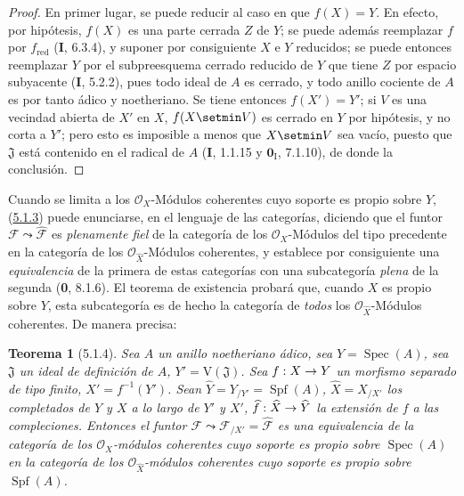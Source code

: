 \documentclass[10pt,oneside,openany]{book}
\theoremstyle{egaenv}\newtheorem*{env}{---}
\theoremstyle{egastatement}
\newtheorem*{theorem}{Teorema}
\theoremstyle{egadescription}
\renewcommand{\to}{\mathchoice{\longrightarrow}{\rightarrow}{\rightarrow}{\rightarrow}}
\begin{document}
\begin{proof}
En primer lugar, se puede reducir al caso en que $f(X)=Y$. En efecto, por hipótesis,
$f(X)$ es una parte cerrada $Z$ de $Y$; se puede además reemplazar $f$ por
$f_{\mathrm{red}}$ (\textbf{I}, 6.3.4), y suponer por consiguiente $X$ e $Y$ reducidos; se puede entonces
reemplazar $Y$ por el subpreesquema cerrado reducido de $Y$ que tiene $Z$ por espacio
subyacente (\textbf{I}, 5.2.2), pues todo ideal de $A$ es cerrado, y todo anillo cociente de
$A$ es por tanto ádico y noetheriano. Se tiene entonces $f(X')=Y'$; si $V$ es una vecindad
abierta de $X'$ en $X$, $f(X\setmin V)$ es cerrado en $Y$ por hipótesis, y no corta
a $Y'$; pero esto es imposible a menos que $X\setmin V$ sea vacío, puesto que
$\mathfrak J$ está contenido en el radical de $A$ (\textbf{I}, 1.1.15 y $\mathbf{0}_{\mathrm I}$,
7.1.10), de donde la conclusión.
\end{proof}

Cuando se limita a los $\mathcal O_X$-Módulos coherentes cuyo soporte es propio
sobre $Y$, (\hyperref[III.5.1.3-fr]{5.1.3}) puede enunciarse, en el lenguaje de las
categorías, diciendo que el funtor
$\mathcal F\leadsto\widehat{\mathcal F}$ es \emph{plenamente fiel} de la categoría de los
$\mathcal O_X$-Módulos del tipo precedente en la categoría de los
$\mathcal O_{\widehat X}$-Módulos coherentes, y establece por consiguiente una \emph{equivalencia} de
la primera de estas categorías con una subcategoría \emph{plena} de la segunda
(\textbf{0}, 8.1.6). El teorema de existencia probará que, cuando $X$ es propio sobre $Y$,
esta subcategoría es de hecho la categoría de \emph{todos} los
$\mathcal O_{\widehat X}$-Módulos coherentes. De manera precisa:

\begin{theorem}[5.1.4]
\label{III.5.1.4}
\label{III.5.1.4-fr}
Sea $A$ un anillo noetheriano ádico, sea $Y=\operatorname{Spec}(A)$, sea
$\mathfrak J$ un ideal de definición de $A$, $Y'=\mathrm V(\mathfrak J)$. Sea $f:X\to Y$ un morfismo separado de tipo finito, $X'=f^{-1}(Y')$. Sean
$\widehat Y=Y_{/Y'}=\operatorname{Spf}(A)$, $\widehat X=X_{/X'}$ los completados de
$Y$ y $X$ a lo largo de $Y'$ y $X'$, $\widehat f:\widehat X\to\widehat Y$ la extensión de $f$ a
las compleciones. Entonces el funtor
$\mathcal F\leadsto\mathcal F_{/X'}=\widehat{\mathcal F}$
es una equivalencia de la categoría de los
$\mathcal O_X$-módulos coherentes cuyo soporte es propio sobre $\operatorname{Spec}(A)$ en la
categoría de los $\mathcal O_{\widehat X}$-módulos coherentes cuyo soporte
es propio sobre $\operatorname{Spf}(A)$.
\end{theorem}
\end{document}
